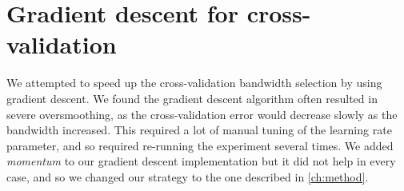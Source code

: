 \section{Gradient descent for cross-validation}
\label{sec:discussion:gradient_descent}

We attempted to speed up the cross-validation bandwidth selection by using gradient descent.
We found the gradient descent algorithm often resulted in severe oversmoothing,
as the cross-validation error would decrease slowly as the bandwidth increased.
This required a lot of manual tuning of the learning rate parameter, and so required re-running the experiment several times.
We added \textit{momentum} to our gradient descent implementation but it did not help in every case, and so we changed our strategy to the one described in \autoref{ch:method}.


